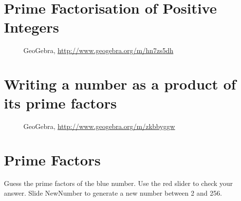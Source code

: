 \section{{Prime Factorisation of Positive Integers }}
\begin{figure}[H]
\begin{center}
\caption*{GeoGebra, \url{http://www.geogebra.org/m/hn7zs5dh}}
\end{center}
\end{figure}

\section{{Writing a number as a product of its prime factors}}
\begin{figure}[H]
\begin{center}
\caption*{GeoGebra, \url{http://www.geogebra.org/m/zkbbyggw}}
\end{center}
\end{figure}

\section{{Prime Factors}}
Guess the prime factors of the blue number.  Use the red slider to check your answer.  Slide NewNumber to generate a new number between 2 and 256.

